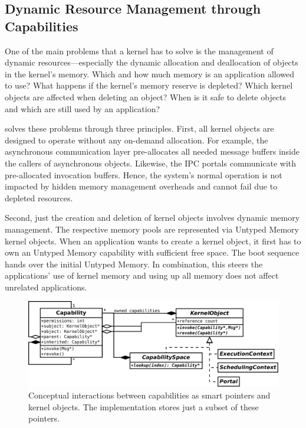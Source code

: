 \subsection{Dynamic Resource Management through Capabilities}
\label{sec:log:capabilities}

One of the main problems that a kernel has to solve is the management of dynamic resources---especially the dynamic allocation and deallocation of objects in the kernel's memory. Which and how much memory is an application allowed to use? What happens if the kernel's memory reserve is depleted? Which kernel objects are affected when deleting an object? When is it safe to delete objects and which are still used by an application?

\mythos solves these problems through three principles. First, all kernel objects are designed to operate without any on-demand allocation. For example, the asynchronous communication layer  pre-allocates all needed message buffers inside the callers of asynchronous objects. Likewise, the IPC portals communicate with pre-allocated invocation buffers. Hence, the system's normal operation is not impacted by hidden memory management overheads and cannot fail due to depleted resources. 

Second, just the creation and deletion of kernel objects involves dynamic memory management. The respective memory pools are represented via Untyped Memory kernel objects. When an application wants to create a kernel object, it first has to own an Untyped Memory capability with sufficient free space.  The boot sequence hands over the initial Untyped Memory. In combination, this steers the applications' use of kernel memory and using up all memory does not affect unrelated applications.

\begin{figure}
  \centering
  \includegraphics[scale=0.25]{fig/capability-model.pdf}
  \caption{Conceptual interactions between capabilities as smart pointers and kernel objects. The implementation stores just a subset of these pointers.}
  \label{fig:capability-model}
\end{figure}

